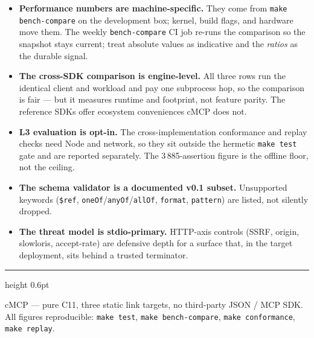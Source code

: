 \documentclass[10pt]{article}
\newcommand{\code}[1]{\texttt{\small #1}}
\begin{document}
\begin{itemize}
  \item \textbf{Performance numbers are machine-specific.} They come from
    \code{make bench-compare} on the development box; kernel, build flags, and
    hardware move them. The weekly \code{bench-compare} CI job re-runs the
    comparison so the snapshot stays current; treat absolute values as
    indicative and the \emph{ratios} as the durable signal.
  \item \textbf{The cross-SDK comparison is engine-level.} All three rows run
    the identical client and workload and pay one subprocess hop, so the
    comparison is fair --- but it measures runtime and footprint, not feature
    parity. The reference SDKs offer ecosystem conveniences cMCP does not.
  \item \textbf{L3 evaluation is opt-in.} The cross-implementation conformance
    and replay checks need Node and network, so they sit outside the hermetic
    \code{make test} gate and are reported separately. The 3\,885-assertion
    figure is the offline floor, not the ceiling.
  \item \textbf{The schema validator is a documented v0.1 subset.} Unsupported
    keywords (\code{\$ref}, \code{oneOf}/\code{anyOf}/\code{allOf},
    \code{format}, \code{pattern}) are listed, not silently dropped.
  \item \textbf{The threat model is stdio-primary.} HTTP-axis controls
    (SSRF, origin, slowloris, accept-rate) are defensive depth for a surface
    that, in the target deployment, sits behind a trusted terminator.
\end{itemize}

\vfill
{\color{rulegrey}\hrule height 0.6pt}
\vspace{4pt}
{\small\color{rulegrey}
cMCP --- pure C11, three static link targets, no third-party JSON / MCP SDK.
All figures reproducible: \code{make test}, \code{make bench-compare},
\code{make conformance}, \code{make replay}.}
\end{document}
